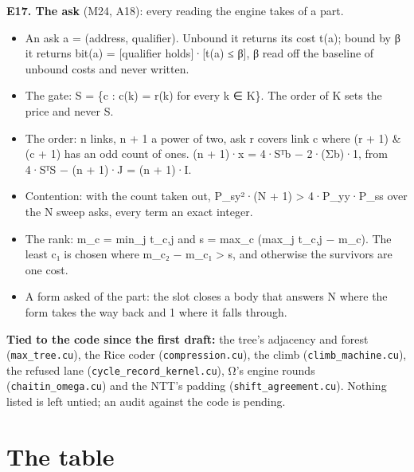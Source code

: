 \textbf{E17. The ask} (M24, A18): every reading the engine takes of a part.

\begin{itemize}
\item An ask a = (address, qualifier). Unbound it returns its cost t(a); bound by β it returns bit(a) = [qualifier holds]·[t(a) ≤ β], β read off the baseline of unbound costs and never written.
\item The gate: S = \{c : c(k) = r(k) for every k ∈ K\}. The order of K sets the price and never S.
\item The order: n links, n + 1 a power of two, ask r covers link c where (r + 1) \& (c + 1) has an odd count of ones. (n + 1)·x = 4·Sᵀb − 2·(Σb)·1, from 4·SᵀS − (n + 1)·J = (n + 1)·I.
\item Contention: with the count taken out, P\_\allowbreak{}sy²·(N + 1) > 4·P\_\allowbreak{}yy·P\_\allowbreak{}ss over the N sweep asks, every term an exact integer.
\item The rank: m\_\allowbreak{}c = min\_\allowbreak{}j t\_\allowbreak{}c,j and s = max\_\allowbreak{}c (max\_\allowbreak{}j t\_\allowbreak{}c,j − m\_\allowbreak{}c). The least c₁ is chosen where m\_\allowbreak{}c₂ − m\_\allowbreak{}c₁ > s, and otherwise the survivors are one cost.
\item A form asked of the part: the slot closes a body that answers N where the form takes the way back and 1 where it falls through.
\end{itemize}

\textbf{Tied to the code since the first draft:} the tree's adjacency and forest (\texttt{max\_\allowbreak{}tree.\allowbreak{}cu}), the Rice coder (\texttt{compression.\allowbreak{}cu}), the climb (\texttt{climb\_\allowbreak{}machine.\allowbreak{}cu}), the refused lane (\texttt{cycle\_\allowbreak{}record\_\allowbreak{}kernel.\allowbreak{}cu}), Ω's engine rounds (\texttt{chaitin\_\allowbreak{}omega.\allowbreak{}cu}) and the NTT's padding (\texttt{shift\_\allowbreak{}agreement.\allowbreak{}cu}). Nothing listed is left untied; an audit against the code is pending.

\section{\texorpdfstring{The table}{The table}}

